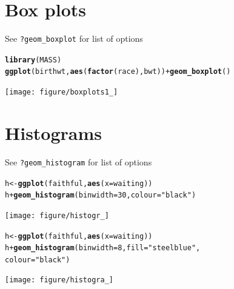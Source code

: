 \documentclass{beamer}\usepackage{graphicx, color}
\makeatletter
\newcommand{\hlfunctioncall}[1]{\textcolor[rgb]{0.501960784313725,0,0.329411764705882}{\textbf{#1}}}%
\newcommand{\hlstring}[1]{\textcolor[rgb]{0.6,0.6,1}{#1}}%
\newenvironment{kframe}{%
 \def\at@end@of@kframe{}%
 \ifinner\ifhmode%
  \def\at@end@of@kframe{\end{minipage}}%
  \begin{minipage}{\columnwidth}%
 \fi\fi%
 \def\FrameCommand##1{\hskip\@totalleftmargin \hskip-\fboxsep
 \colorbox{shadecolor}{##1}\hskip-\fboxsep
     \hskip-\linewidth \hskip-\@totalleftmargin \hskip\columnwidth}%
 \MakeFramed {\advance\hsize-\width
   \@totalleftmargin\z@ \linewidth\hsize
   \@setminipage}}%
 {\par\unskip\endMakeFramed%
 \at@end@of@kframe}
\newenvironment{knitrout}{}{} %
\makeatother
\begin{document}
\section*{Box plots}
\frame{\sectionpage}

\begin{frame}[fragile]
See \texttt{?geom\_boxplot} for list of options
\begin{knitrout}\footnotesize
{}\color{fgcolor}\begin{kframe}
\begin{alltt}
\hlfunctioncall{library}(MASS)
\hlfunctioncall{ggplot}(birthwt, \hlfunctioncall{aes}(\hlfunctioncall{factor}(race), bwt)) + \hlfunctioncall{geom_boxplot}()
\end{alltt}
\end{kframe}
\texttt{[image: figure/boxplots1\_]} 

\end{knitrout}

\end{frame}


\section*{Histograms}
\frame{\sectionpage}

\begin{frame}[fragile]
See \texttt{?geom\_histogram} for list of options
\begin{knitrout}\footnotesize
{}\color{fgcolor}\begin{kframe}
\begin{alltt}
h <- \hlfunctioncall{ggplot}(faithful, \hlfunctioncall{aes}(x = waiting))
h + \hlfunctioncall{geom_histogram}(binwidth = 30, colour = \hlstring{"black"})
\end{alltt}
\end{kframe}
\texttt{[image: figure/histogr\_]} 

\end{knitrout}

\end{frame}

\begin{frame}[fragile]
\begin{knitrout}\footnotesize
{}\color{fgcolor}\begin{kframe}
\begin{alltt}
h <- \hlfunctioncall{ggplot}(faithful, \hlfunctioncall{aes}(x = waiting))
h + \hlfunctioncall{geom_histogram}(binwidth = 8, fill = \hlstring{"steelblue"},
colour = \hlstring{"black"})
\end{alltt}
\end{kframe}
\texttt{[image: figure/histogra\_]} 

\end{knitrout}

\end{frame}
\end{document}
